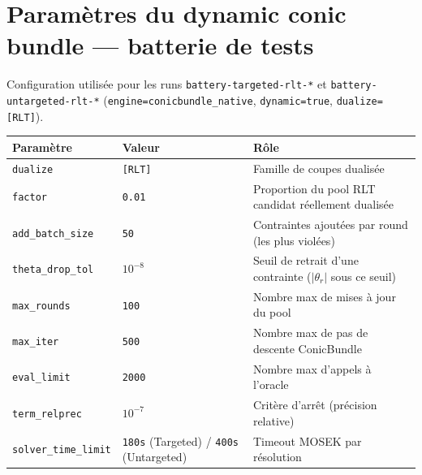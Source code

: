 \documentclass{article}
\begin{document}
\section*{Param\`etres du dynamic conic bundle --- batterie de tests}

Configuration utilis\'ee pour les runs \texttt{battery-targeted-rlt-*} et
\texttt{battery-untargeted-rlt-*} (\texttt{engine=conicbundle\_native},
\texttt{dynamic=true}, \texttt{dualize=[RLT]}).

\begin{table}[h]
\centering
\begin{tabular}{l l l}
\toprule
Param\`etre & Valeur & R\^ole \\
\midrule
\texttt{dualize}          & \texttt{[RLT]} & Famille de coupes dualis\'ee \\
\texttt{factor}           & \texttt{0.01}  & Proportion du pool RLT candidat r\'eellement dualis\'ee \\
\texttt{add\_batch\_size} & \texttt{50}    & Contraintes ajout\'ees par round (les plus viol\'ees) \\
\texttt{theta\_drop\_tol} & $10^{-8}$      & Seuil de retrait d'une contrainte ($|\theta_r|$ sous ce seuil) \\
\texttt{max\_rounds}      & \texttt{100}   & Nombre max de mises \`a jour du pool \\
\texttt{max\_iter}        & \texttt{500}   & Nombre max de pas de descente ConicBundle \\
\texttt{eval\_limit}      & \texttt{2000}  & Nombre max d'appels \`a l'oracle \\
\texttt{term\_relprec}    & $10^{-7}$      & Crit\`ere d'arr\^et (pr\'ecision relative) \\
\texttt{solver\_time\_limit} & \texttt{180s} (Targeted) / \texttt{400s} (Untargeted) & Timeout MOSEK par r\'esolution \\
\bottomrule
\end{tabular}
\end{table}
\end{document}
